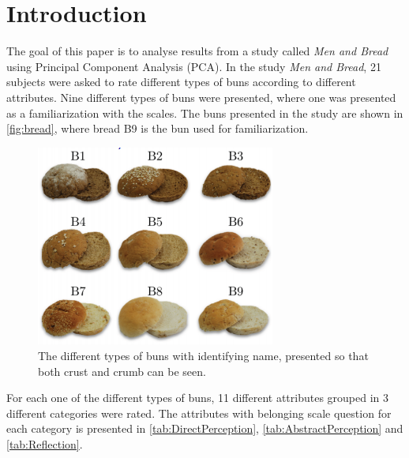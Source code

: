 \chapter*{Introduction}
\label{introduction}
%
The goal of this paper is to analyse results from a study called \textit{Men and Bread} using Principal Component Analysis (PCA). \blankline
% 
In the study \textit{Men and Bread}, 21 subjects were asked to rate different types of buns according to different attributes. Nine different types of buns were presented, where one was presented as a familiarization with the scales. The buns presented in the study are shown in \autoref{fig:bread}, where bread B9 is the bun used for familiarization. 
%
\begin{figure}[H]
\centering
\includegraphics[width =0.7\textwidth]{Figure/Bread}
\caption{The different types of buns with identifying name, presented so that both crust and crumb can be seen.}
\label{fig:bread}
\end{figure}
\noindent
%
For each one of the different types of buns, 11 different attributes grouped in 3 different categories were rated. The attributes with belonging scale question for each category is presented in \autoref{tab:DirectPerception}, \autoref{tab:AbstractPerception} and \autoref{tab:Reflection}.

